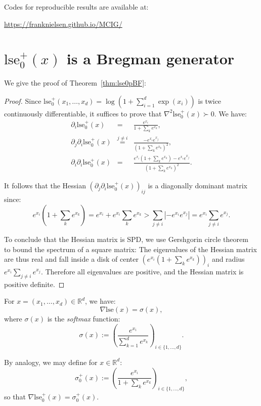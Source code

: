 \documentclass[graybox]{svmult}
\def\lse{\mathrm{lse}}
\def\eqdef{:=}
\def\bbR{\mathbb{R}}
\begin{document}
\vskip 0.5cm
Codes for reproducible results are available at: \\
\centerline{\url{https://franknielsen.github.io/MCIG/}}





\appendix

\section{$\lse_0^+(x)$ is a Bregman generator\label{sec:proof-lse0p}}
We give the proof of Theorem~\ref{thm:lse0pBF}:
 

\begin{proof}
Since $\lse_0^+(x_1,\ldots, x_d)=\log \left(1+ \sum_{i=1}^d \exp(x_i)\right)$ is twice continuously differentiable, it suffices to prove that $\nabla^2\lse_0^+(x)\succ 0$.
We have:
\begin{eqnarray}
\partial_i \lse_0^+(x) &=& \frac{e^{x_i}}{1+\sum_k e^{x_k}},\\
\partial_j\partial_i \lse_0^+(x) &\stackrel{j\not = i}{=}&  \frac{-e^{x_i} e^{x_j} }{(1+\sum_k e^{x_k})^2},\\
 \partial_i\partial_i \lse_0^+(x) &=&  \frac{e^{x_i}(1+\sum_k e^{x_k}) -e^{x_i} e^{x_j} }{(1+\sum_k e^{x_k})^2}.
\end{eqnarray}

It follows that the Hessian $(\partial_j\partial_i \lse_0^+(x))_{ij}$ is a diagonally dominant matrix since:
\begin{equation}
e^{x_i}\left(1+\sum_k e^{x_k}\right) = e^{x_i} + e^{x_i}\sum_k e^{x_k} > \sum_{j\not =i} \left|-e^{x_i} e^{x_j} \right| = e^{x_i}  \sum_{j\not =i} e^{x_j}.
\end{equation}

To conclude that the Hessian matrix is SPD, we use Gershgorin circle theorem~\cite{Gervsgorin-2010} to bound the spectrum of a square matrix: 
The eigenvalues of the Hessian matrix are thus real and fall inside a disk of center $(e^{x_i}(1+\sum_k e^{x_k}))_i$ and radius $e^{x_i}  \sum_{j\not =i} e^{x_j}$. Therefore all eigenvalues are positive, and the Hessian matrix is positive definite.

\end{proof}

For $x=(x_1,\ldots, x_d)\in\bbR^d$, we have:
\begin{equation}
 \nabla\lse(x) = \sigma(x),
\end{equation}
where $\sigma(x)$ is the {\em softmax} function:
\begin{equation}
\sigma(x) \eqdef \left( \frac{e^{x_i}}{\sum_{k=1}^d e^{x_k}} \right)_{i\in\{1,\ldots, d\}}.
\end{equation}

By analogy, we may define for $x\in\bbR^d$:
\begin{equation}
\sigma_0^+(x) \eqdef \left( \frac{e^{x_i}}{1+\sum_k e^{x_k}} \right)_{i\in\{1,\ldots, d\}},
\end{equation}
so that $\nabla \lse_0^+(x) =\sigma_0^+(x)$.
\end{document}
